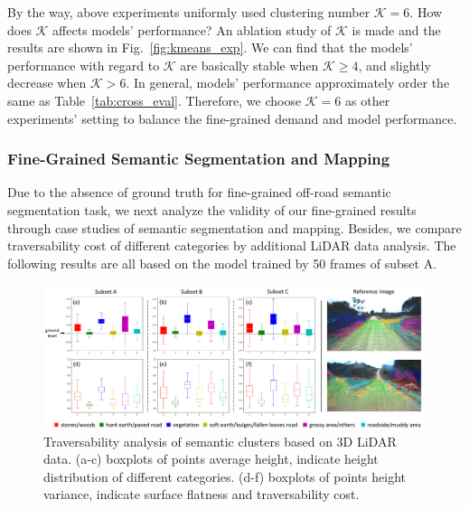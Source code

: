 \documentclass[letterpaper, 10 pt, conference]{ieeeconf}  %
\begin{document}
By the way, above experiments uniformly used clustering number $\mathcal{K}=6$. How does $\mathcal{K}$ affects models' performance? An ablation study of $\mathcal{K}$ is made and the results are shown in Fig.~\ref{fig:kmeans_exp}. We can find that the models' performance with regard to $\mathcal{K}$ are basically stable when $\mathcal{K} \geq 4$, and slightly decrease when $\mathcal{K}>6$. In general, models' performance approximately order the same as Table~\ref{tab:cross_eval}. Therefore, we choose $\mathcal{K}=6$ as other experiments' setting to balance the fine-grained demand and model performance.


\subsubsection{Fine-Grained Semantic Segmentation and Mapping}

Due to the absence of ground truth for fine-grained off-road semantic segmentation task, we next analyze the validity of our fine-grained results through case studies of semantic segmentation and mapping. Besides, we compare traversability cost of different categories by additional LiDAR data analysis. The following results are all based on the model trained by 50 frames of subset A.

\begin{figure}[]
	\centering
	\includegraphics[width=\textwidth]{lidar_analysis.pdf}
	\caption{Traversability analysis of semantic clusters based on 3D LiDAR data. (a-c) boxplots of points average height, indicate height distribution of different categories. (d-f) boxplots of points height variance, indicate surface flatness and traversability cost. }
	\label{fig:lidar_analysis}
	\vspace{-5mm}
\end{figure}
\end{document}
